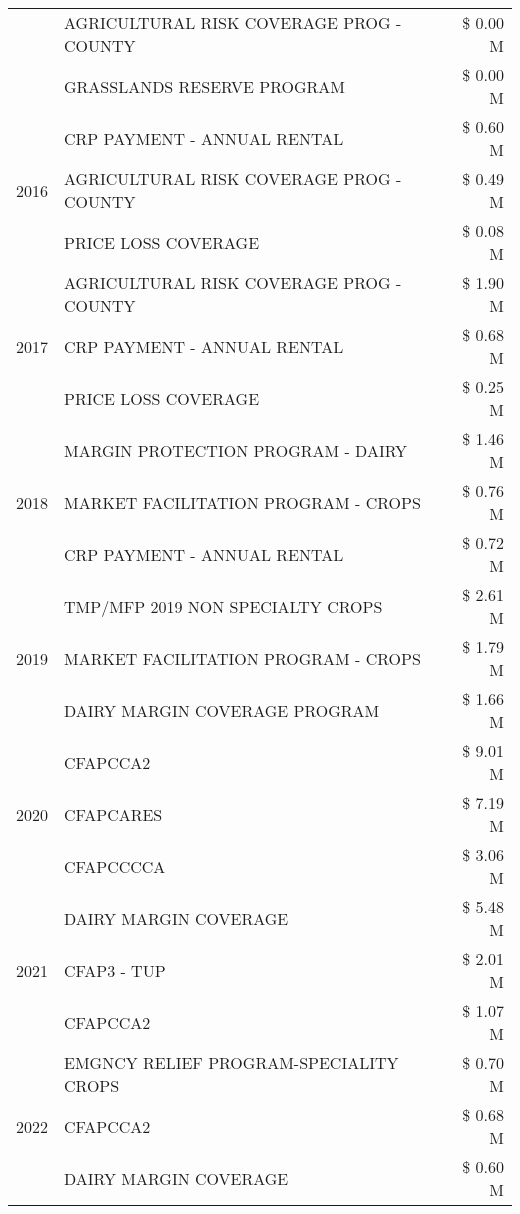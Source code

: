 \begin{tabular}{llr}
 & AGRICULTURAL RISK COVERAGE PROG - COUNTY & \$ 0.00 M \\
 & GRASSLANDS RESERVE PROGRAM & \$ 0.00 M \\
\cline{1-3}
\multirow[t]{3}{*}{2016} & CRP PAYMENT - ANNUAL RENTAL & \$ 0.60 M \\
 & AGRICULTURAL RISK COVERAGE PROG - COUNTY & \$ 0.49 M \\
 & PRICE LOSS COVERAGE & \$ 0.08 M \\
\cline{1-3}
\multirow[t]{3}{*}{2017} & AGRICULTURAL RISK COVERAGE PROG - COUNTY & \$ 1.90 M \\
 & CRP PAYMENT - ANNUAL RENTAL & \$ 0.68 M \\
 & PRICE LOSS COVERAGE & \$ 0.25 M \\
\cline{1-3}
\multirow[t]{3}{*}{2018} & MARGIN PROTECTION PROGRAM - DAIRY & \$ 1.46 M \\
 & MARKET FACILITATION PROGRAM - CROPS & \$ 0.76 M \\
 & CRP PAYMENT - ANNUAL RENTAL & \$ 0.72 M \\
\cline{1-3}
\multirow[t]{3}{*}{2019} & TMP/MFP 2019 NON SPECIALTY CROPS & \$ 2.61 M \\
 & MARKET FACILITATION PROGRAM - CROPS & \$ 1.79 M \\
 & DAIRY MARGIN COVERAGE PROGRAM & \$ 1.66 M \\
\cline{1-3}
\multirow[t]{3}{*}{2020} & CFAPCCA2 & \$ 9.01 M \\
 & CFAPCARES & \$ 7.19 M \\
 & CFAPCCCCA & \$ 3.06 M \\
\cline{1-3}
\multirow[t]{3}{*}{2021} & DAIRY MARGIN COVERAGE & \$ 5.48 M \\
 & CFAP3 - TUP & \$ 2.01 M \\
 & CFAPCCA2 & \$ 1.07 M \\
\cline{1-3}
\multirow[t]{3}{*}{2022} & EMGNCY RELIEF PROGRAM-SPECIALITY CROPS & \$ 0.70 M \\
 & CFAPCCA2 & \$ 0.68 M \\
 & DAIRY MARGIN COVERAGE & \$ 0.60 M \\
\cline{1-3}
\bottomrule
\end{tabular}
